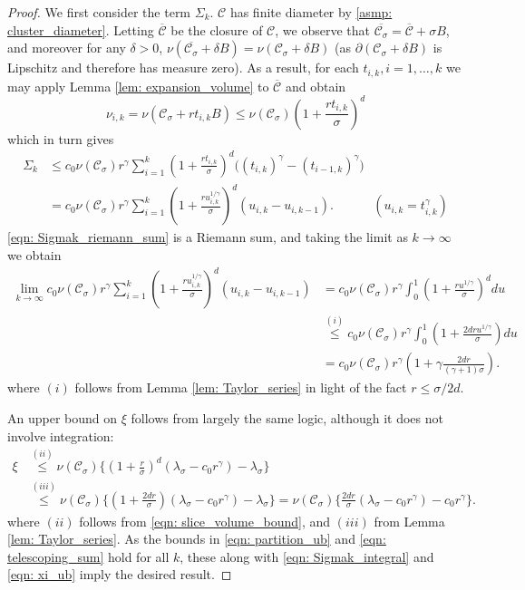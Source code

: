 \documentclass{article}
\newcommand{\1}{\mathbf{1}}
\newcommand{\Cset}{\mathcal{C}}
\newcommand{\Csig}{\Cset_{\sigma}}
\theoremstyle{aldenthm}
\begin{document}
\begin{proof}
	We first consider the term $\Sigma_k$. $\Cset$ has finite diameter by \ref{asmp: cluster_diameter}. Letting $\overline{\Cset}$ be the closure of $\Cset$, we observe that $\overline{\Csig} = \overline{\Cset} + \sigma B$, and moreover for any $\delta > 0$, $\nu(\overline{\Csig} + \delta B) = \nu(\Csig + \delta B)$ (as $\partial(\Csig + \delta B)$ is Lipschitz and therefore has measure zero). As a result, for each $t_{i,k}, i = 1, \ldots,k$ we may apply Lemma \ref{lem: expansion_volume} to $\overline{\Cset}$ and obtain
	\begin{equation}
	\label{eqn: slice_volume_bound}
	\nu_{i,k} = \nu(\Csig + rt_{i,k}B) \leq \nu(\Csig)\left(1 + \frac{rt_{i,k}}{\sigma}\right)^d
	\end{equation}
	which in turn gives
	\begin{align}
	\Sigma_k & \leq c_0\nu(\Csig) r^\gamma \sum_{i = 1}^{k} \left(1 + \frac{ rt_{i,k}}{\sigma}\right)^d \biggl( (t_{i,k})^{\gamma} - (t_{i-1,k})^{\gamma}\biggr) \nonumber \\
	& = c_0\nu(\Csig) r^\gamma \sum_{i = 1}^{k} \left(1 + \frac{ru_{i,k}^{1/\gamma}}{\sigma}\right)^d ( u_{i,k} - u_{i,k-1}).~~~~~~~~~~~~~~ (u_{i,k} = t_{i,k}^{\gamma}) \label{eqn: Sigmak_riemann_sum}
	\end{align}
	\eqref{eqn: Sigmak_riemann_sum} is a Riemann sum, and taking the limit as $k \to \infty$ we obtain
	\begin{align}
	\lim_{k \to \infty} c_0\nu(\Csig) r^\gamma \sum_{i = 1}^{k} \left(1 + \frac{ru_{i,k}^{1/\gamma}}{\sigma}\right)^d ( u_{i,k} - u_{i,k-1}) & = c_0\nu(\Csig) r^\gamma \int_{0}^{1} \left(1 + \frac{r u^{1/\gamma}}{\sigma}\right)^{d} du \nonumber \\
	& \overset{(i)}{\leq} c_0\nu(\Csig) r^\gamma \int_{0}^{1} \left(1 + \frac{2 d r u^{1/\gamma}}{\sigma}\right) du \nonumber \\
	& = c_0\nu(\Csig) r^\gamma \left(1 + \gamma \frac{2 d r}{(\gamma + 1)\sigma}\right). \label{eqn: Sigmak_integral}
	\end{align}
	where $(i)$ follows from Lemma \ref{lem: Taylor_series} in light of the fact $r \leq \sigma / 2d$. 
	
	An upper bound on $\xi$ follows from largely the same logic, although it does not involve integration:
	\begin{align}
	\xi & \overset{(ii)}{\leq} \nu(\Csig) \biggl\{ \left(1 + \frac{ r}{\sigma}\right)^d(\lambda_{\sigma} - c_0r^{\gamma}) - \lambda_{\sigma} \biggr\} \nonumber \\
	& \overset{(iii)}{\leq} \nu(\Csig) \biggl\{ \left(1 + \frac{2d r}{\sigma}\right)(\lambda_{\sigma} - c_0r^{\gamma}) - \lambda_{\sigma} \biggr\} = \nu(\Csig) \biggl\{ \frac{2dr}{\sigma}(\lambda_{\sigma} - c_0r^{\gamma}) - c_0 r^{\gamma} \biggr\}. \label{eqn: xi_ub}
	\end{align}
	where $(ii)$ follows from \eqref{eqn: slice_volume_bound}, and $(iii)$ from Lemma \ref{lem: Taylor_series}. As the bounds in \eqref{eqn: partition_ub} and \eqref{eqn: telescoping_sum} hold for all $k$, these along with \eqref{eqn: Sigmak_integral} and \eqref{eqn: xi_ub} imply the desired result.
\end{proof}
\end{document}
